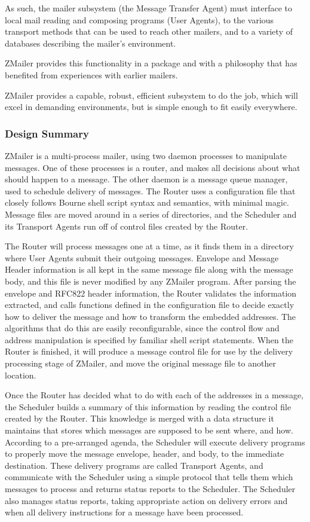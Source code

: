 As such, the mailer subsystem (the Message Transfer Agent) must
interface to local mail reading and composing programs (User Agents),
to the various transport methods that can be used to reach other mailers,
and to a variety of databases describing the mailer's environment.

ZMailer provides this functionality in a package and with a philosophy
that has benefited from experiences with earlier mailers.

ZMailer provides a capable, robust, efficient subsystem to do the job,
which will excel in demanding environments, but is simple enough to
fit easily everywhere.


\subsubsection{Design Summary}

ZMailer is a multi-process mailer, using two daemon processes to manipulate
messages.  One of these processes is a router, and makes all decisions
about what should happen to a message.  The other daemon is a message queue
manager, used to schedule delivery of messages.  The Router uses a
configuration file that closely follows Bourne shell script syntax and
semantics, with minimal magic.  Message files are moved around in a series
of directories, and the Scheduler and its Transport Agents run off of
control files created by the Router.

The Router will process messages one at a time, as it finds them in a
directory where User Agents submit their outgoing messages.  Envelope and
Message Header information is all kept in the same message file along with
the message body, and this file is never modified by any ZMailer program.
After parsing the envelope and RFC822 header information, the Router
validates the information extracted, and calls functions defined in the
configuration file to decide exactly how to deliver the message and how to
transform the embedded addresses.  The algorithms that do this are easily
reconfigurable, since the control flow and address manipulation is
specified by familiar shell script statements.  When the Router is
finished, it will produce a message control file for use by the delivery
processing stage of ZMailer, and move the original message file to another
location.

Once the Router has decided what to do with each of the addresses in a
message, the Scheduler builds a summary of this information by reading the
control file created by the Router.  This knowledge is merged with a data
structure it maintains that stores which messages are supposed to be sent
where, and how.  According to a pre-arranged agenda, the Scheduler will
execute delivery programs to properly move the message envelope, header,
and body, to the immediate destination.  These delivery programs are called
Transport Agents, and communicate with the Scheduler using a simple
protocol that tells them which messages to process and returns status
reports to the Scheduler.  The Scheduler also manages status reports,
taking appropriate action on delivery errors and when all delivery
instructions for a message have been processed.

